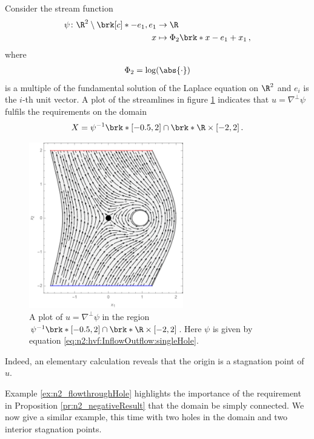 \begin{example}\label{ex:n2_flowthroughHole}
  Consider the stream function
  \begin{equation}
    \begin{aligned}
    \psi\colon \R^2\setminus\brk[c]*{-e_1,e_1}&\to\R \\
    x&\mapsto\Phi_2\brk*{x-e_1}+x_1\,,
    \end{aligned}\label{eq:n2:hvf:InflowOutflow:singleHole}
  \end{equation}
  where
  \begin{align}
    \Phi_2=\log(\abs{\cdot})\label{eq:n2_defPhi}
  \end{align}
  is a multiple of the fundamental solution of the Laplace equation on $\R^2$ and $e_i$ is the $i$-th unit vector.
  A plot of the streamlines in figure \ref{pl:n2_hvf_InflowOutflow_asymmetric_single} indicates that $u=\nabla^\perp\psi$ fulfils the
  requirements on the domain
  $$X=\psi^{-1}\brk*{[-0.5,2]}\cap \brk*{\R\times[-2,2]}\,.$$
  \begin{figure}%
    \centering
    \includegraphics[width=0.6\textwidth]{../Plots/n2_hvf_InflowOutflow_asymmetric_gray_2.pdf}
    \caption{A plot of $u=\nabla^\perp\psi$ in the region $\psi^{-1}\brk*{[-0.5,2]}\cap \brk*{\R\times[-2,2]}$.
    Here $\psi$ is given by equation \eqref{eq:n2:hvf:InflowOutflow:singleHole}.}
    \label{pl:n2_hvf_InflowOutflow_asymmetric_single}
  \end{figure}%
  Indeed, an elementary calculation reveals that the origin is a stagnation point of $u$.
\end{example}
Example \ref{ex:n2_flowthroughHole} highlights the importance of the requirement in Proposition \ref{pr:n2_negativeResult} that the domain be simply connected.
We now give a similar example, this time with two holes in the domain and two interior stagnation points.

